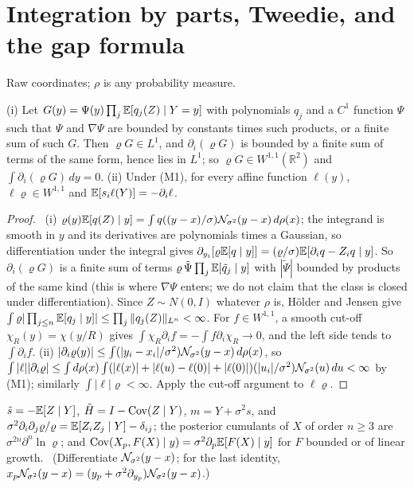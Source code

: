 \section{Integration by parts, Tweedie, and the gap formula}
\label{app:parts}

Raw coordinates; $\rho$ is any probability measure.

\begin{lemma}\label{lem:ibp}
(i) Let $G(y)=\Psi(y)\prod_j\mathbb{E}[q_j(Z)\mid Y=y]$ with polynomials $q_j$ and a $C^1$ function $\Psi$ such that $\Psi$ and $\nabla\Psi$ are bounded by constants times such products, or a finite sum of such $G$.
Then $\varrho G\in L^1$, and $\partial_i(\varrho G)$ is bounded by a finite sum of terms of the same form, hence lies in $L^1$; so $\varrho G\in W^{1,1}(\mathbb R^2)$ and $\int\partial_i(\varrho G)\,dy=0$.
(ii) Under \textup{(M1)}, for every affine function $\ell(y)$, $\ell\varrho\in W^{1,1}$ and $\mathbb{E}[s_i\ell(Y)]=-\partial_i\ell$.
\end{lemma}
\begin{proof}\proofst\
(i) $\varrho(y)\mathbb{E}[q(Z)\mid y]=\int q((y-x)/\sigma)\mathcal N_{\sigma^2}(y-x)\,d\rho(x)$; the integrand is smooth in $y$ and its derivatives are polynomials times a Gaussian, so differentiation under the integral gives $\partial_{y_i}[\varrho\mathbb{E}[q\mid y]]=(\varrho/\sigma)\mathbb{E}[\partial_iq-Z_iq\mid y]$.
So $\partial_i(\varrho G)$ is a finite sum of terms $\varrho\,\tilde\Psi\prod_j\mathbb{E}[\tilde q_j\mid y]$ with $|\tilde\Psi|$ bounded by products of the same kind (this is where $\nabla\Psi$ enters; we do not claim that the class is closed under differentiation).
Since $Z\sim N(0,I)$ whatever $\rho$ is, H\"older and Jensen give $\int\varrho|\prod_{j\le n}\mathbb{E}[q_j\mid y]|\le\prod_j\|q_j(Z)\|_{L^n}<\infty$.
For $f\in W^{1,1}$, a smooth cut-off $\chi_R(y)=\chi(y/R)$ gives $\int\chi_R\partial_if=-\int f\partial_i\chi_R\to0$, and the left side tends to $\int\partial_if$.
(ii) $|\partial_i\varrho(y)|\le\int(|y_i-x_i|/\sigma^2)\mathcal N_{\sigma^2}(y-x)\,d\rho(x)$, so $\int|\ell||\partial_i\varrho|\le\int d\rho(x)\int(|\ell(x)|+|\ell(u)-\ell(0)|+|\ell(0)|)(|u_i|/\sigma^2)\mathcal N_{\sigma^2}(u)\,du<\infty$ by (M1); similarly $\int|\ell|\varrho<\infty$.
Apply the cut-off argument to $\ell\varrho$.
\end{proof}

\begin{lemma}\label{lem:tweedie}
$\tilde s=-\mathbb{E}[Z\mid Y]$, $\tilde H=I-\operatorname{Cov}(Z\mid Y)$, $m=Y+\sigma^2s$, and $\sigma^2\partial_i\partial_j\varrho/\varrho=\mathbb{E}[Z_iZ_j\mid Y]-\delta_{ij}$; the posterior cumulants of $X$ of order $n\ge3$ are $\sigma^{2n}\partial^n\ln\varrho$; and $\operatorname{Cov}(X_p,F(X)\mid y)=\sigma^2\partial_p\mathbb{E}[F(X)\mid y]$ for $F$ bounded or of linear growth.
\proofst\ (Differentiate $\mathcal N_{\sigma^2}(y-x)$; for the last identity, $x_p\mathcal N_{\sigma^2}(y-x)=(y_p+\sigma^2\partial_{y_p})\mathcal N_{\sigma^2}(y-x)$.)
\end{lemma}


